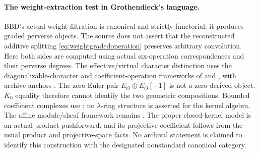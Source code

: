 \paragraph{The weight-extraction test in Grothendieck's language.}
BBD's actual weight filtration is canonical and strictly
functorial; it produces graded perverse objects. The source
does not assert that the reconstructed additive splitting
\eqref{eq:weightgradedoperation} preserves arbitrary
convolution. Here both sides are computed using actual
six-operation correspondences and their perverse degrees.
The effective/virtual character distinction uses the
diagonalizable-character and coefficient-operation
frameworks of \cite[Expos\'e~I, 4.7.2--3]{SGA3} and
\cite[Expos\'e~V, \S\S2--3]{SGA6}, with archive anchors
\cite[cote~90, scan~17; cote~133, scan~18]{Archive}.
The zero Euler pair \(E_O\oplus E_O[-1]\) is not a zero
derived object. \(K_0\) equality therefore cannot identify
the two geometric compositions. Bounded coefficient
complexes use \cite[Expos\'e~I, Definition~4.7,
pp.~121--122, and Example~4.8, p.~122]{SGA6}; no
\(\lambda\)-ring structure is asserted for the kernel algebra.
The affine module/sheaf framework remains
\cite[Theorem~1.3.7, p.~86; Corollary~1.3.8, p.~87;
Theorem~1.4.1, pp.~90--92]{EGA}. The proper closed-kernel
model is an actual product pushforward, and its projective
coefficient follows from the usual product and
projective-space facts. No archival statement is claimed
to identify this construction with the designated
nonstandard canonical category.
